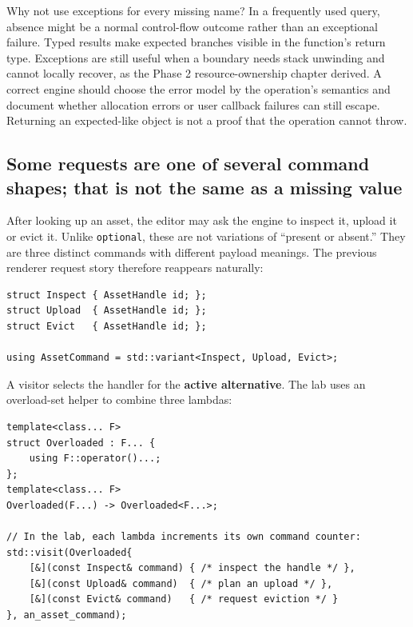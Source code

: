 Why not use exceptions for every missing name? In a frequently used query, absence might be a normal control-flow outcome rather than an exceptional failure. Typed results make expected branches visible in the function's return type. Exceptions are still useful when a boundary needs stack unwinding and cannot locally recover, as the Phase 2 resource-ownership chapter derived. A correct engine should choose the error model by the operation's semantics and document whether allocation errors or user callback failures can still escape. Returning an expected-like object is not a proof that the operation cannot throw.

\subsection{Some requests are one of several command shapes; that is not the same as a missing value}\label{05-engine-i-ch006-some-requests-are-one-of-several-command-shapes-that-is-not-the-same-as-a-missing-value}

After looking up an asset, the editor may ask the engine to inspect it, upload it or evict it. Unlike \texttt{optional}, these are not variations of ``present or absent.'' They are three distinct commands with different payload meanings. The previous renderer request story therefore reappears naturally:

\begin{verbatim}
struct Inspect { AssetHandle id; };
struct Upload  { AssetHandle id; };
struct Evict   { AssetHandle id; };

using AssetCommand = std::variant<Inspect, Upload, Evict>;
\end{verbatim}

A visitor selects the handler for the \textbf{active alternative}. The lab uses an overload-set helper to combine three lambdas:

\begin{verbatim}
template<class... F>
struct Overloaded : F... {
    using F::operator()...;
};
template<class... F>
Overloaded(F...) -> Overloaded<F...>;

// In the lab, each lambda increments its own command counter:
std::visit(Overloaded{
    [&](const Inspect& command) { /* inspect the handle */ },
    [&](const Upload& command)  { /* plan an upload */ },
    [&](const Evict& command)   { /* request eviction */ }
}, an_asset_command);
\end{verbatim}

